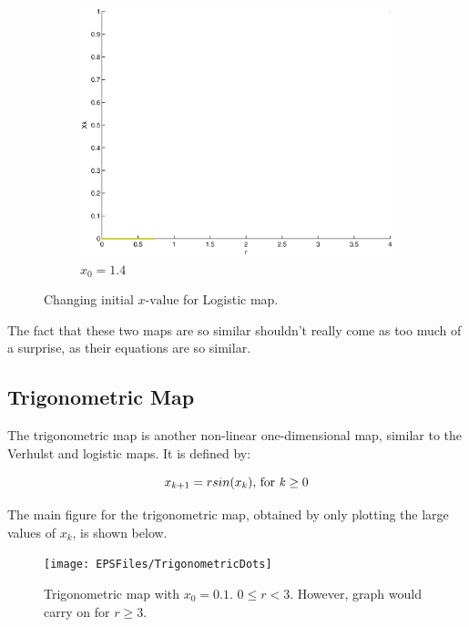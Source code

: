 \documentclass[a4wide, 10pt]{article}
\begin{document}
\begin{figure}[H]
\begin{subfigure}[b]{0.2\textwidth}
                \includegraphics[width=\textwidth]{EPSFiles/Logistic14}
                \caption{$x_{0} = 1.4$}
        \end{subfigure}  
        \caption{Changing initial $x \textrm{-value}$ for Logistic map.}
\end{figure}

The fact that these two maps are so similar shouldn't really come as too much of a surprise, as their
 equations are so similar.

\subsection{Trigonometric Map}

The trigonometric map is another non-linear one-dimensional map, similar to the Verhulst and logistic
 maps. It is defined by: 

\[
  x_{k+1} = rsin(x_{k}) \textrm{, for \emph{k}} \geq 0
\]


The main figure for the trigonometric map, obtained by only plotting the large values of $x_{k}$, is
 shown below.

\begin{figure}[H]

    \centering

    \texttt{[image: EPSFiles/TrigonometricDots]}

    \caption{Trigonometric map with $x_{0} = 0.1$. $0 \leq r < 3$. However, graph would carry on for $r \geq 3$.}

\end{figure} 
\end{document}
